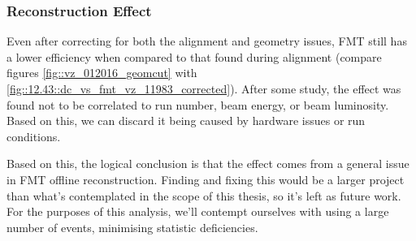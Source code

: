 \subsubsection{Reconstruction Effect}
\label{sssec::reconstruction_effect}
    Even after correcting for both the alignment and geometry issues, FMT still has a lower efficiency when compared to that found during alignment (compare figures \ref{fig::vz_012016_geomcut} with \ref{fig::12.43::dc_vs_fmt_vz_11983_corrected}).
    After some study, the effect was found not to be correlated to run number, beam energy, or beam luminosity.
    Based on this, we can discard it being caused by hardware issues or run conditions.

    Based on this, the logical conclusion is that the effect comes from a general issue in FMT offline reconstruction.
    Finding and fixing this would be a larger project than what's contemplated in the scope of this thesis, so it's left as future work.
    For the purposes of this analysis, we'll contempt ourselves with using a large number of events, minimising statistic deficiencies.
